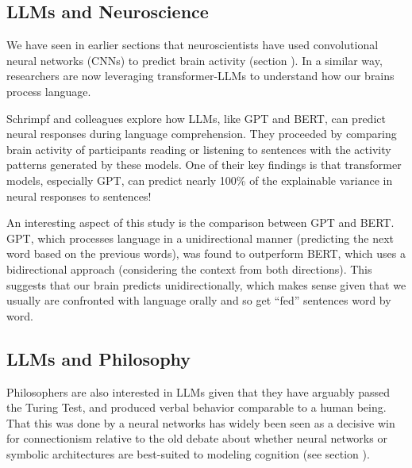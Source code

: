 \subsection{LLMs and Neuroscience}

We have seen in earlier sections that neuroscientists have used convolutional neural networks (CNNs) to predict brain activity (section ). In a similar way, researchers are now leveraging transformer-LLMs to understand how our brains process language. 

Schrimpf and colleagues \cite{schrimpf2021neural} explore how LLMs, like GPT and BERT, can predict neural responses during language comprehension. They proceeded by comparing  brain activity of participants reading or listening to sentences with the activity patterns generated by these models. One of their key findings is that transformer models, especially GPT, can predict nearly 100\% of the explainable variance in neural responses to sentences! 

An interesting aspect of this study is the comparison between GPT and BERT. GPT, which processes language in a unidirectional manner (predicting the next word based on the previous words), was found to outperform BERT, which uses a bidirectional approach (considering the context from both directions). This suggests that our brain predicts unidirectionally, which  makes sense given that we usually are confronted with language orally and so get ``fed'' sentences word by word. 


\subsection{LLMs and Philosophy}\label{llmPhilosophy}

Philosophers are also interested in LLMs given that they have arguably passed the Turing Test, and produced verbal behavior comparable to a human being. That this was done by a neural networks has widely been seen as a decisive win for connectionism relative to the old debate about whether neural networks or symbolic architectures are best-suited to modeling cognition (see section ).  

